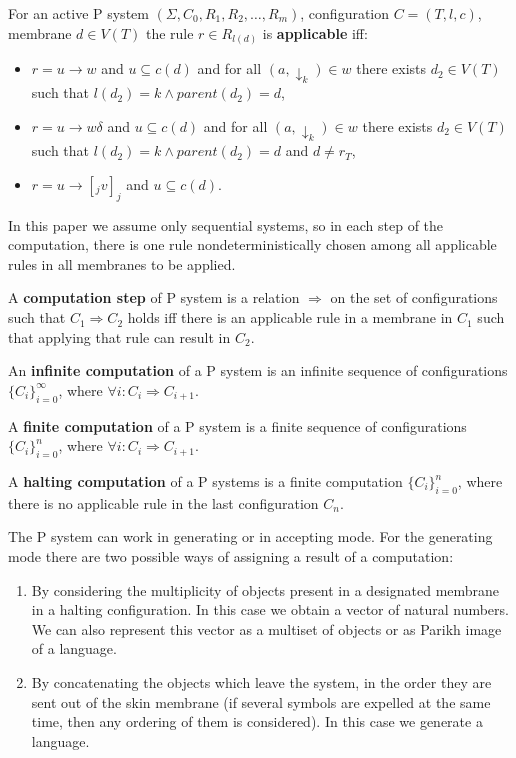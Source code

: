 
For an active P system $(\Sigma, C_0, R_1, R_2, \dots , R_m)$, configuration $C = (T, l, c)$, membrane $d\in V(T)$ the rule $r\in R_{l(d)}$ is {\bf applicable} iff:
\begin{itemize}
  \item $r = u\rightarrow w$ and $u\subseteq c(d)$ and for all $(a,\downarrow_k)\in w$ there exists $d_2\in V(T)$ such that $l(d_2)=k \wedge parent(d_2) = d$,
  \item $r = u\rightarrow w\delta$ and $u\subseteq c(d)$ and for all $(a,\downarrow_k)\in w$ there exists $d_2\in V(T)$ such that $l(d_2)=k \wedge parent(d_2) = d$ and $d\neq r_T$,
  \item $r = u\rightarrow [_j v]_j$ and $u\subseteq c(d)$.
\end{itemize}

In this paper we assume only sequential systems, so in each step of the computation, there is one rule nondeterministically chosen among all applicable rules in all membranes to be applied.


A {\bf computation step} of P system is a relation $\Rightarrow$ on the set of configurations such that $C_1 \Rightarrow C_2$ holds iff there is an applicable rule in a membrane in $C_1$ such that applying that rule can result in $C_2$.

An {\bf infinite computation} of a P system is an infinite sequence of configurations $\{C_i\}_{i=0}^\infty$, where $\forall i: C_i\Rightarrow C_{i+1}$.

A {\bf finite computation} of a P system is a finite sequence of configurations $\{C_i\}_{i=0}^n$, where $\forall i: C_i\Rightarrow C_{i+1}$.

A {\bf halting computation} of a P systems is a finite computation $\{C_i\}_{i=0}^n$, where there is no applicable rule in the last configuration $C_n$.


The P system can work in generating or in accepting mode. For the generating mode there are two possible ways of assigning a result of a computation:

\begin{enumerate}
    \item By considering the multiplicity of objects present in a designated membrane in a halting configuration. In this case we obtain a vector of natural numbers. We can also represent this vector as a multiset of objects or as Parikh image of a language.
    \item By concatenating the objects which leave the system, in the order they are sent out of the skin membrane (if several symbols are expelled at the same time, then any ordering of them is considered). In this case we generate a language.
\end{enumerate}

